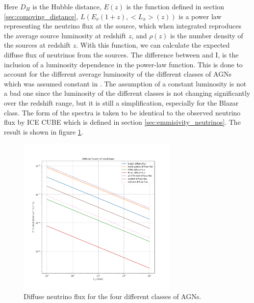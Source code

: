 Here $D_H$ is the Hubble distance, $E(z)$ is the function defined in section \ref{sec:comoving_distance}, $L(E_\nu (1+z), <L_x>(z))$ is a power law representing the neutrino flux at the source, which when integrated reproduces the average source luminosity at redshift $z$, and $\rho(z)$ is the number density of the sources at redshift $z$.
With this function, we can calculate the expected diffuse flux of neutrinos from the sources. The difference between \cite{Palladino_2020} and I, is the inclusion of a luminosity dependence in the power-law function. This is done to account for the different average luminosity of the different classes of AGNs which was assumed constant in \cite{Palladino_2020}. 
The assumption of a constant luminosity is not a bad one since the luminosity of the different classes is not changing significantly over the redshift range, but it is still a simplification, especially for the Blazar class. The form of the spectra is taken to be identical to the observed neutrino flux by ICE CUBE which is defined in section \ref*{sec:emmisivity_neutrinos}.
The result is shown in figure \ref{fig:neutrino_diffuse}.
\begin{figure}[H]
    \centering
    \includegraphics[width = 0.7\textwidth]{new_plots/diffuse_fluxes_neutrino_no_cutoff.png}
    \caption{Diffuse neutrino flux for the four different classes of AGNs.}
    \label{fig:neutrino_diffuse}
\end{figure}

